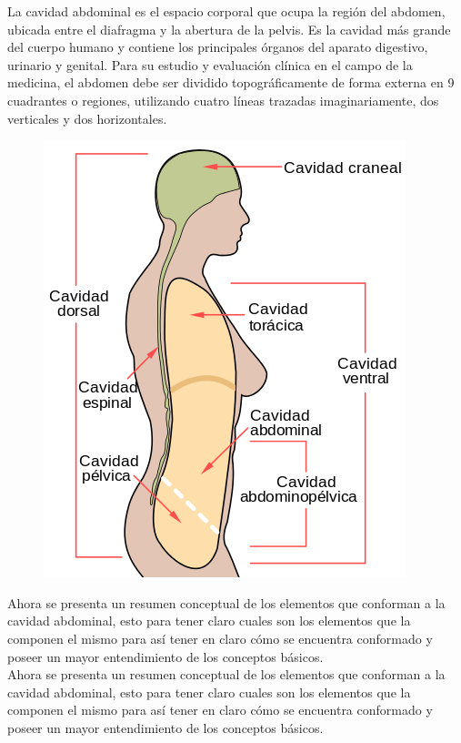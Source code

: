 La cavidad abdominal es el espacio corporal que ocupa la región del abdomen, ubicada entre el diafragma y la abertura de la pelvis. 
Es la cavidad más grande del cuerpo humano y contiene los principales órganos del aparato digestivo, urinario y genital.
Para su estudio y evaluación clínica en el campo de la medicina, el abdomen debe ser dividido topográficamente de forma externa en 9 
cuadrantes o regiones, utilizando cuatro líneas trazadas imaginariamente, dos verticales y dos horizontales.\cite{web12}
\begin{figure}[H]
	\begin{center}
 		\includegraphics[width = .3\textwidth]{source/images/image56.png}
	\end{center} 
\end{figure}
Ahora se presenta un resumen conceptual de los elementos que conforman a la cavidad abdominal, esto para tener claro cuales son los elementos 
que la componen el mismo para así tener en claro cómo se encuentra conformado y poseer un mayor entendimiento de los conceptos básicos.\\
Ahora se presenta un resumen conceptual de los elementos que conforman a la cavidad abdominal, esto para tener claro cuales son los elementos 
que la componen el mismo para así tener en claro cómo se encuentra conformado y poseer un mayor entendimiento de los conceptos básicos.\\
